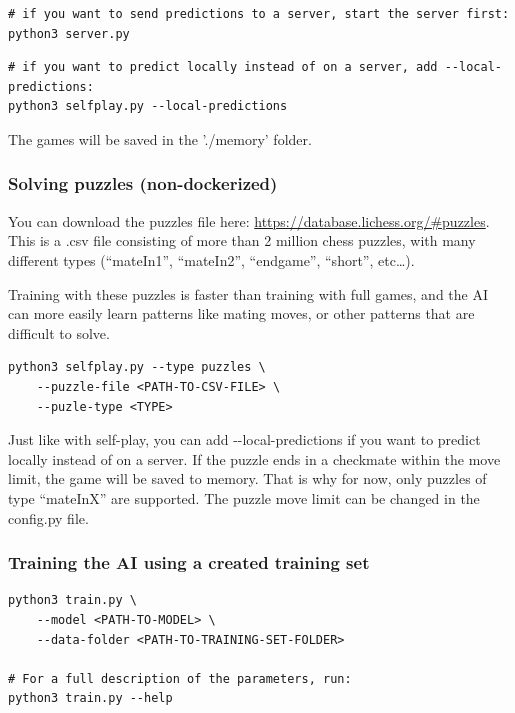 \documentclass{article}
\begin{document}
\begin{verbatim}
# if you want to send predictions to a server, start the server first:
python3 server.py
\end{verbatim}


\begin{verbatim}
# if you want to predict locally instead of on a server, add --local-predictions:
python3 selfplay.py --local-predictions
\end{verbatim}

The games will be saved in the './memory' folder.

\subsubsection{Solving puzzles (non-dockerized)}

You can download the puzzles file here: \url{https://database.lichess.org/#puzzles}.
This is a .csv file consisting of more than 2 million chess puzzles, 
with many different types (``mateIn1'', ``mateIn2'', ``endgame'', ``short'', etc\dots).

Training with these puzzles is faster than training with full games, and the AI can
more easily learn patterns like mating moves, or other patterns that are difficult to solve. 

\begin{verbatim}
python3 selfplay.py --type puzzles \
    --puzzle-file <PATH-TO-CSV-FILE> \
    --puzle-type <TYPE>
\end{verbatim}

Just like with self-play, you can add -{}-local-predictions if you want to predict locally instead of on a server.
If the puzzle ends in a checkmate within the move limit, the game will be saved to memory. That is why for now, only puzzles of type ``mateInX'' are supported.
The puzzle move limit can be changed in the config.py file.

\subsubsection{Training the AI using a created training set}

\begin{verbatim}
python3 train.py \
    --model <PATH-TO-MODEL> \
    --data-folder <PATH-TO-TRAINING-SET-FOLDER>

# For a full description of the parameters, run:
python3 train.py --help
\end{verbatim}
\end{document}
